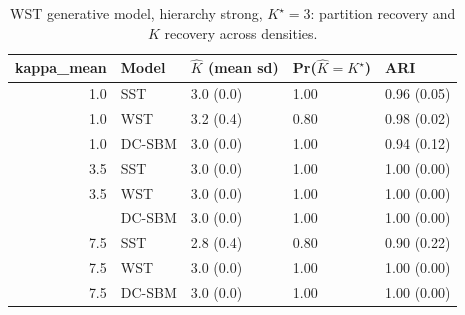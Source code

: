 \begin{table}
\centering
\caption{WST generative model, hierarchy strong, $K^\star=3$: partition recovery and $K$ recovery across densities.}
\centering
\begin{tabular}[t]{rllll}
\toprule
kappa_mean & Model & $\hat K$ (mean sd) & Pr($\hat K = K^\star$) & ARI\\
\midrule
1.0 & SST & 3.0 (0.0) & 1.00 & 0.96 (0.05)\\
1.0 & WST & 3.2 (0.4) & 0.80 & 0.98 (0.02)\\
1.0 & DC-SBM & 3.0 (0.0) & 1.00 & 0.94 (0.12)\\
3.5 & SST & 3.0 (0.0) & 1.00 & 1.00 (0.00)\\
3.5 & WST & 3.0 (0.0) & 1.00 & 1.00 (0.00)\\
\addlinespace
3.5 & DC-SBM & 3.0 (0.0) & 1.00 & 1.00 (0.00)\\
7.5 & SST & 2.8 (0.4) & 0.80 & 0.90 (0.22)\\
7.5 & WST & 3.0 (0.0) & 1.00 & 1.00 (0.00)\\
7.5 & DC-SBM & 3.0 (0.0) & 1.00 & 1.00 (0.00)\\
\bottomrule
\end{tabular}
\end{table}
